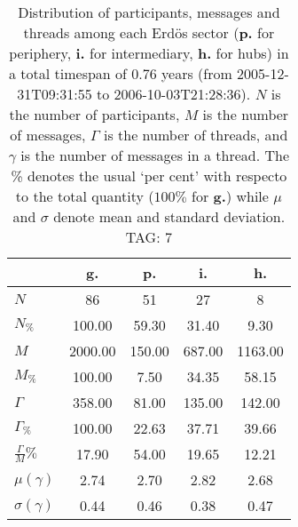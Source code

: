 \begin{table}[h!]
\begin{center}
\begin{tabular}{| l | c | c | c | c |}\hline
 & g. & p. & i. & h. \\\hline
$N$ & 86  & 51  & 27  & 8 \\\hline
$N_{\%}$ & 100.00  & 59.30  & 31.40  & 9.30 \\\hline
$M$ & 2000.00  & 150.00  & 687.00  & 1163.00 \\\hline
$M_{\%}$ & 100.00  & 7.50  & 34.35  & 58.15 \\\hline
$\Gamma$ & 358.00  & 81.00  & 135.00  & 142.00 \\\hline
$\Gamma_{\%}$ & 100.00  & 22.63  & 37.71  & 39.66 \\\hline
$\frac{\Gamma}{M}\%$ & 17.90  & 54.00  & 19.65  & 12.21 \\\hline
$\mu(\gamma)$ & 2.74  & 2.70  & 2.82  & 2.68 \\\hline
$\sigma(\gamma)$ & 0.44  & 0.46  & 0.38  & 0.47 \\\hline
\end{tabular}
\caption{Distribution of participants, messages and threads among each Erd\"os sector ({\bf p.} for periphery, {\bf i.} for intermediary, 
    {\bf h.} for hubs) in a total timespan of 0.76 years (from 2005-12-31T09:31:55 to 2006-10-03T21:28:36). $N$ is the number of participants, $M$ is the number of messages, $\Gamma$ is the number of threads, and $\gamma$ is the number of messages in a thread.
    The \% denotes the usual `per cent' with respecto to the total quantity ($100\%$ for {\bf g.})
    while $\mu$ and $\sigma$ denote mean and standard deviation. TAG: 7}
\end{center}
\end{table}